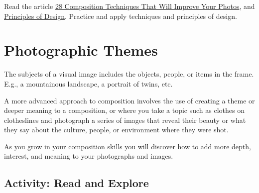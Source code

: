 \documentclass[
]{book}
\begin{document}
\begin{reflect}
Read the article \href{https://petapixel.com/photography-composition-techniques/}{28 Composition Techniques That Will Improve Your Photos}, and \href{https://www.getty.edu/education/teachers/building_lessons/principles_design.pdf}{Principles of Design}. Practice and apply techniques and principles of design.
\end{reflect}

\hypertarget{photographic-themes}{%
\section{Photographic Themes}\label{photographic-themes}}

The subjects of a visual image includes the objects, people, or items in the frame. E.g., a mountainous landscape, a portrait of twins, etc.

A more advanced approach to composition involves the use of creating a theme or deeper meaning to a composition, or where you take a topic such as clothes on clotheslines and photograph a series of images that reveal their beauty or what they say about the culture, people, or environment where they were shot.

As you grow in your composition skills you will discover how to add more depth, interest, and meaning to your photographs and images.

\hypertarget{activity-read-and-explore}{%
\subsection*{Activity: Read and Explore}\label{activity-read-and-explore}}
\end{document}
